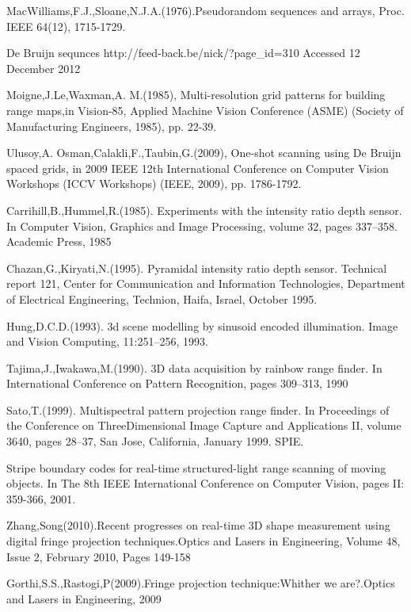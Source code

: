 \begin{singlespace}
\begin{thebibliography}{10000000000}
MacWilliams,F.J.,Sloane,N.J.A.(1976).Pseudorandom sequences and 
arrays, Proc. IEEE 64(12), 1715-1729. 

De Bruijn sequnces\newline 
http://feed-back.be/nick/?page\_id=310\newline
Accessed 12 December 2012

Moigne,J.Le,Waxman,A. M.(1985), Multi-resolution grid patterns for 
building range maps,in Vision-85, Applied Machine Vision Conference 
(ASME) (Society of Manufacturing Engineers, 1985), pp. 22-39. 

Ulusoy,A. Osman,Calakli,F.,Taubin,G.(2009), One-shot scanning using De 
Bruijn spaced grids, in 2009 IEEE 12th International Conference on Computer 
Vision Workshops (ICCV Workshops) (IEEE, 2009), pp. 1786-1792. 
 
Carrihill,B.,Hummel,R.(1985). Experiments with the intensity ratio depth sensor. In Computer Vision, Graphics and Image 
Processing, volume 32, pages 337--358. Academic Press, 1985 

Chazan,G.,Kiryati,N.(1995). Pyramidal intensity ­ratio depth sensor. Technical report 121, Center for Communication and Informa­tion Technologies, Department of Electrical Engineering, Technion, Haifa, Israel, October 1995. 

Hung,D.C.D.(1993). 3d scene modelling by sinusoid encoded illumination. Image and Vision Computing, 11:251--256, 1993. 

Tajima,J.,Iwakawa,M.(1990). 3D data acquisition by rainbow range finder. In International Conference on Pattern Recognition, pages 309--313, 1990 

Sato,T.(1999). Multispectral pattern projection range finder. In Proceedings of the Conference on ThreeDimensional Image Capture and Applications II, volume 3640, pages 28--37, San Jose, California, January 1999. SPIE. 

Stripe boundary codes for real-time structured-light range scanning of moving 
objects. In The 8th IEEE International Conference on 
Computer Vision, pages II: 359-366, 2001. 

Zhang,Song(2010).Recent progresses on real-time 3D shape measurement using digital fringe projection techniques.Optics and Lasers in Engineering, Volume 48, Issue 2, February 2010, Pages 149-158 

Gorthi,S.S.,Rastogi,P(2009).Fringe projection technique:Whither we are?.Optics and Lasers in Engineering, 2009 


\end{thebibliography}
\end{singlespace}
